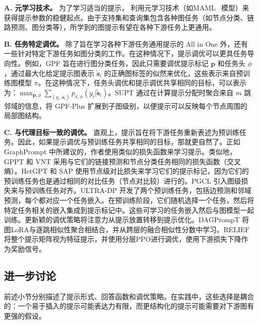 \textbf{A. 元学习技术。}
为了学习适当的提示，\citet{sun2023all} 利用元学习技术（如MAML~\cite{finn2017modelagnostic} 模型）来获得提示参数的稳健起点。由于支持集和查询集包含各种图任务（如节点分类、链路预测、图分类等），所学到的图提示有望在各种下游任务上更通用。

\textbf{B. 任务特定调优。}
除了旨在学习各种下游任务通用提示的 All in One \cite{sun2023all} 外，还有一些针对特定下游任务如图分类的工作。在这种情况下，提示调优可以更具任务导向性。例如，GPF \cite{fang2022prompt} 旨在进行图分类任务，因此只需要调优提示标记 $\textbf{p}$ 和任务头 $\phi$，通过最大化给定提示图表示 $\tilde{\textbf{s}}_i$ 的正确图标签的似然来优化，这些表示来自预训练图模型 $\pi$。在这种情况下，任务头调优和提示调优共享相同的目标，可以表示为：$\max_{\textbf{p}, \phi} \sum_{(y_i,\tilde{\textbf{s}}_i)} p_{\pi, \phi} (y_i| \tilde{\textbf{s}}_i)$。SUPT \cite{lee2024supt} 通过在计算提示分配时聚合来自 $m$ 跳邻域的信息，将 GPF-Plus 扩展到子图级别，以便提示可以反映每个节点周围的局部图结构。


\textbf{C. 与代理目标一致的调优。}
直观上，提示旨在将下游任务重新表述为预训练任务。因此，如果提示调优与预训练任务共享相同的目标，那就更自然了。正如 GraphPrompt \cite{liu2023graphprompt} 中所建议的，作者使用类似的损失函数来学习提示。类似地，GPPT \cite{sun2022gppt} 和 VNT \cite{tan2023virtual} 采用与它们的链接预测和节点分类任务相同的损失函数（交叉熵）。HetGPT \cite{ma2023hetgpt} 和 SAP \cite{ge2023enhancing} 使用节点级对比损失来学习它们的提示标记，因为它们的预训练任务也是通过相同的对比任务（节点对比较）进行的。PGCL \cite{gong2023prompt} 引入图级损失来与预训练任务对齐。ULTRA-DP \cite{chen2023ultradp} 开发了两个预训练任务，包括边预测和邻域预测，每个都对应一个任务嵌入。在预训练阶段，它们随机选择一个任务，然后将特定任务相关的嵌入集成到提示标记中。这些可学习的任务嵌入然后与图模型一起训练。更新颖的调优策略将注意力从提示放置转移到提示优化。DAGPrompT \cite{chen2025dagprompt} 将图LoRA与逐跳相似性聚合相结合，并从跨层的融合相似性分数中学习。RELIEF \cite{zhu2024relief} 将整个提示矩阵视为特征提示，并使用分层PPO进行调优，使用下游损失下降作为奖励信号。


\subsection{进一步讨论}\label{sec:pdiscussion}

\textit{}

前述小节分别描述了提示形式、回答函数和调优策略。在实践中，这些选择是耦合的：一个易于插入的提示可能表达力有限，而更结构化的提示可能需要对下游图有更强的假设。

